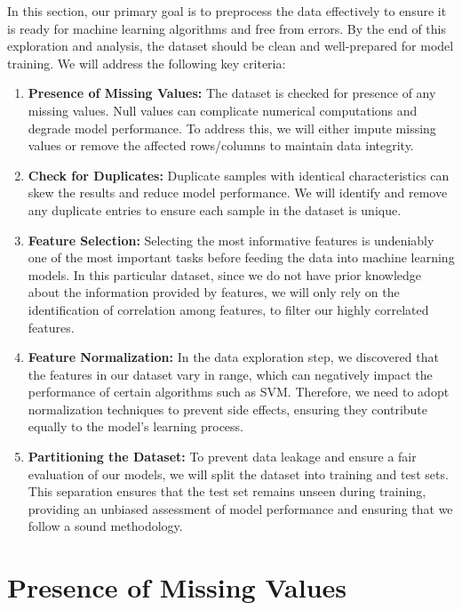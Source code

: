 
In this section, our primary goal is to preprocess the data effectively to ensure it is ready for machine learning algorithms and free from errors. By the end of this exploration and analysis, the dataset should be clean and well-prepared for model training. We will address the following key criteria:

\begin{enumerate}
    \item \textbf{Presence of Missing Values:} The dataset is checked for presence of any missing values. Null values can complicate numerical computations and degrade model performance. To address this, we will either impute missing values or remove the affected rows/columns to maintain data integrity.

    \item \textbf{Check for Duplicates:} Duplicate samples with identical characteristics can skew the results and reduce model performance. We will identify and remove any duplicate entries to ensure each sample in the dataset is unique.

    \item \textbf{Feature Selection:} Selecting the most informative features is undeniably one of the most important tasks before feeding the data into machine learning models. In this particular dataset, since we do not have prior knowledge about the information provided by features, we will only rely on the identification of correlation among features, to filter our highly correlated features.

    \item \textbf{Feature Normalization:} In the data exploration step, we discovered that the features in our dataset vary in range, which can negatively impact the performance of certain algorithms such as SVM. Therefore, we need to adopt normalization techniques to prevent side effects, ensuring they contribute equally to the model's learning process.

    \item \textbf{Partitioning the Dataset:} To prevent data leakage and ensure a fair evaluation of our models, we will split the dataset into training and test sets. This separation ensures that the test set remains unseen during training, providing an unbiased assessment of model performance and ensuring that we follow a sound methodology.
\end{enumerate}

\section{Presence of Missing Values}

